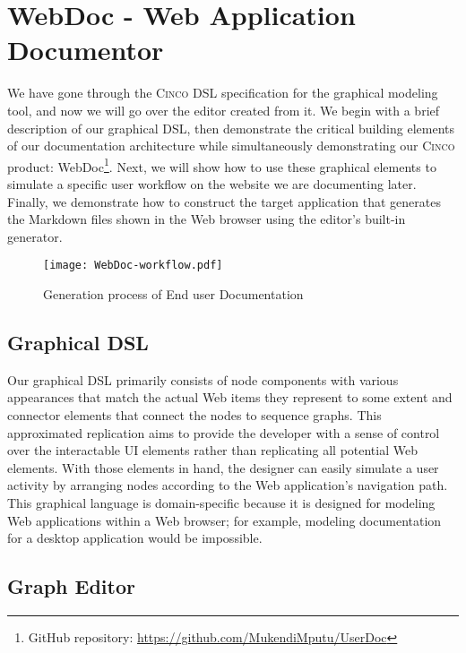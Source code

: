 \chapter{WebDoc - Web Application Documentor}\label{ch:CP}

We have gone through the \textsc{Cinco} DSL specification for the graphical modeling tool, and now we will go over the editor created from it. We begin with a brief description of our graphical DSL, then demonstrate the critical building elements of our documentation architecture while simultaneously demonstrating our \textsc{Cinco} product: WebDoc\footnote{GitHub repository: \url{https://github.com/MukendiMputu/UserDoc}}. Next, we will show how to use these graphical elements to simulate a specific user workflow on the website we are documenting later. Finally, we demonstrate how to construct the target application that generates the Markdown files shown in the Web browser using the editor's built-in generator.

\begin{figure}[h]
    \centering
    \texttt{[image: WebDoc-workflow.pdf]}
    \caption{Generation process of End user Documentation}
    \label{fig:WebDocWorkflow}
\end{figure}

\section{Graphical DSL}\label{sec:gDSL}

Our graphical DSL primarily consists of node components with various appearances that match the actual Web items they represent to some extent and connector elements that connect the nodes to sequence graphs. This approximated replication aims to provide the developer with a sense of control over the interactable UI elements rather than replicating all potential Web elements. With those elements in hand, the designer can easily simulate a user activity by arranging nodes according to the Web application's navigation path. This graphical language is domain-specific because it is designed for modeling Web applications within a Web browser; for example, modeling documentation for a desktop application would be impossible.

\section{Graph Editor}\label{sec:graphEditor}

